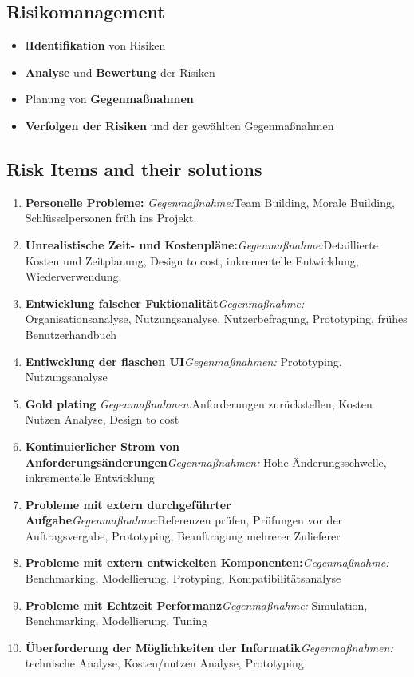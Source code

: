 \documentclass{book}
\begin{document}
    \subsection{Risikomanagement}
    \begin{itemize}
        \item I\textbf{Identifikation} von Risiken
        \item \textbf{Analyse} und \textbf{Bewertung }der Risiken
        \item Planung von \textbf{Gegenmaßnahmen}
        \item \textbf{Verfolgen der Risiken }und der gewählten Gegenmaßnahmen
    \end{itemize}
    \subsection{Risk Items and their solutions}
    \begin{enumerate}
        \item \textbf{Personelle Probleme: }\textit{Gegenmaßnahme:}Team Building, Morale Building, Schlüsselpersonen früh ins Projekt.
        \item \textbf{Unrealistische Zeit- und Kostenpläne:}\textit{Gegenmaßnahme:}Detaillierte Kosten und Zeitplanung, Design to cost, inkrementelle Entwicklung, Wiederverwendung.
        \item \textbf{Entwicklung falscher Fuktionalität}\textit{Gegenmaßnahme:} Organisationsanalyse, Nutzungsanalyse, Nutzerbefragung, Prototyping, frühes Benutzerhandbuch
        \item \textbf{Entiwcklung der flaschen UI}\textit{Gegenmaßnahmen:} Prototyping, Nutzungsanalyse
        \item \textbf{Gold plating} \textit{Gegenmaßnahmen:}Anforderungen zurückstellen, Kosten Nutzen Analyse, Design to cost
        \item \textbf{Kontinuierlicher Strom von Anforderungsänderungen}\textit{Gegenmaßnahmen:} Hohe Änderungsschwelle, inkrementelle Entwicklung
        \item \textbf{Probleme mit extern durchgeführter Aufgabe}\textit{Gegenmaßnahme:}Referenzen prüfen, Prüfungen vor der Auftragsvergabe, Prototyping, Beauftragung mehrerer Zulieferer
        \item \textbf{Probleme mit extern entwickelten Komponenten:}\textit{Gegenmaßnahme:} Benchmarking, Modellierung, Protyping, Kompatibilitätsanalyse
        \item \textbf{Probleme mit Echtzeit  Performanz}\textit{Gegenmaßnahme: }Simulation, Benchmarking, Modellierung, Tuning
        \item \textbf{Überforderung der Möglichkeiten der Informatik}\textit{Gegenmaßnahmen: }technische Analyse, Kosten/nutzen Analyse, Prototyping
    \end{enumerate}
\end{document}
